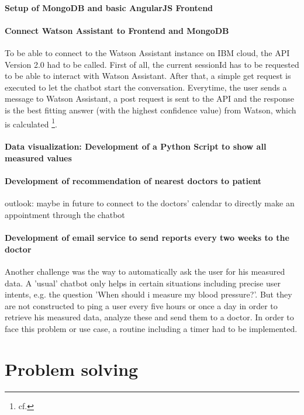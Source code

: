 \paragraph{Setup of MongoDB and basic AngularJS Frontend}

\paragraph{Connect Watson Assistant to Frontend and MongoDB}

To be able to connect to the Watson Assistant instance on IBM cloud, the API Version 2.0 had to be called. First of all, the current sessionId has to be requested to be able to interact with Watson Assistant. After that, a simple get request is executed to let the chatbot start the conversation. Everytime, the user sends a message to Watson Assistant, a post request is sent to the API and the response is the best fitting answer (with the highest confidence value) from Watson, which is calculated \footnote{cf.\autocite{wa_api_v2}}.

\paragraph{Data visualization: Development of a Python Script to show all measured values}

\paragraph{Development of recommendation of nearest doctors to patient}
outlook: maybe in future to connect to the doctors' calendar to directly make an appointment through the chatbot

\paragraph{Development of email service to send reports every two weeks to the doctor}

Another challenge was the way to automatically ask the user for his measured data. A 'usual' chatbot only helps in certain situations including precise user intents, e.g. the question 'When should i measure my blood pressure?'. But they are not constructed to ping a user every five hours or once a day in order to retrieve his measured data, analyze these and send them to a doctor. 
In order to face this problem or use case, a routine including a timer had to be implemented.

\section{Problem solving}
